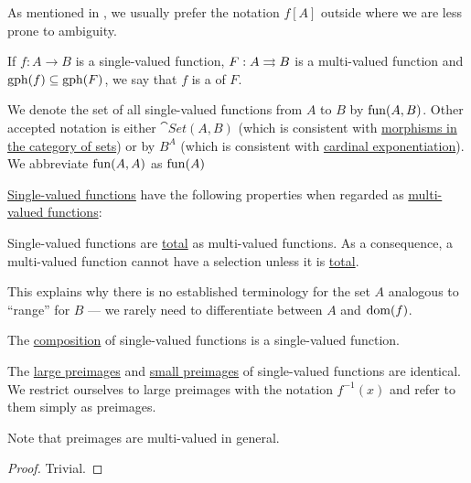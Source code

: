 \begin{definition}
\begin{thmenum}
    As mentioned in , we usually prefer the notation \( f[A] \) outside  where we are less prone to ambiguity.

     If \( f: A \to B \) is a single-valued function, \( F: A \rightrightarrows B \) is a multi-valued function and \( \operatorname{gph}(f) \subseteq \operatorname{gph}(F) \), we say that \( f \) is a  of \( F \).

     We denote the set of all single-valued functions from \( A \) to \( B \) by \( \operatorname{fun}(A, B) \). Other accepted notation is either \( \cat{Set}(A, B) \) (which is consistent with \hyperref[def:category_of_sets]{morphisms in the category of sets}) or by \( B^A \) (which is consistent with \hyperref[thm:cardinal_exponentiation_power_set]{cardinal exponentiation}). We abbreviate \( \operatorname{fun}(A, A) \) as \( \operatorname{fun}(A) \)
  \end{thmenum}
\end{definition}

\begin{proposition}\label{thm:function_properties}
  \hyperref[def:function]{Single-valued functions} have the following properties when regarded as \hyperref[def:multi_valued_function]{multi-valued functions}:
  \begin{thmenum}
     Single-valued functions are \hyperref[def:multi_valued_function/total]{total} as multi-valued functions. As a consequence, a multi-valued function cannot have a selection unless it is \hyperref[def:multi_valued_function/total]{total}.

    This explains why there is no established terminology for the set \( A \) analogous to \enquote{range} for \( B \) --- we rarely need to differentiate between \( A \) and \( \operatorname{dom}(f) \).

     The \hyperref[def:multi_valued_function/composition]{composition} of single-valued functions is a single-valued function.

     The \hyperref[def:multi_valued_function/large_preimage]{large preimages} and \hyperref[def:multi_valued_function/small_preimage]{small preimages} of single-valued functions are identical. We restrict ourselves to large preimages with the notation \( f^{-1}(x) \) and refer to them simply as preimages.

    Note that preimages are multi-valued in general.
  \end{thmenum}
\end{proposition}
\begin{proof}
  Trivial.
\end{proof}

